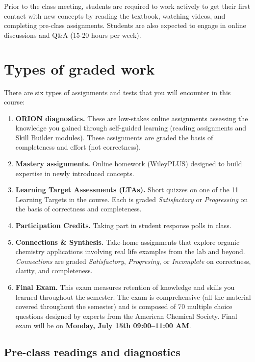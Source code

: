 Prior to the class meeting, students are required to work actively to
get their first contact with new concepts by reading the textbook,
watching videos, and completing pre-class assignments. Students are also
expected to engage in online discussions and Q\&A (15-20 hours per
week).

\hypertarget{types-of-graded-work}{%
\section{Types of graded work}\label{types-of-graded-work}}

There are six types of assignments and tests that you will encounter in
this course:

\begin{enumerate}
\def\labelenumi{\arabic{enumi}.}
\tightlist
\item
  \textbf{ORION diagnostics.} These are low-stakes online assignments
  assessing the knowledge you gained through self-guided learning
  (reading assignments and Skill Builder modules). These assignments are
  graded the basis of completeness and effort (not correctness).
\item
  \textbf{Mastery assignments.} Online homework (WileyPLUS) designed to
  build expertise in newly introduced concepts.
\item
  \textbf{Learning Target Assessments (LTAs).} Short quizzes on one of
  the 11 Learning Targets in the course. Each is graded
  \emph{Satisfactory} or \emph{Progressing} on the basis of correctness
  and completeness.
\item
  \textbf{Participation Credits.} Taking part in student response polls
  in class.
\item
  \textbf{Connections \& Synthesis.} Take-home assignments that explore
  organic chemistry applications involving real life examples from the
  lab and beyond. \emph{Connections} are graded \emph{Satisfactory},
  \emph{Progresing}, or \emph{Incomplete} on correctness, clarity, and
  completeness.
\item
  \textbf{Final Exam.} This exam measures retention of knowledge and
  skills you learned throughout the semester. The exam is comprehensive
  (all the material covered throughout the semester) and is composed of
  70 multiple choice questions designed by experts from the American
  Chemical Society. Final exam will be on \textbf{Monday, July 15th
  09:00--11:00 AM}.
\end{enumerate}

\hypertarget{pre-class-readings-and-diagnostics}{%
\subsection{Pre-class readings and
diagnostics}\label{pre-class-readings-and-diagnostics}}

